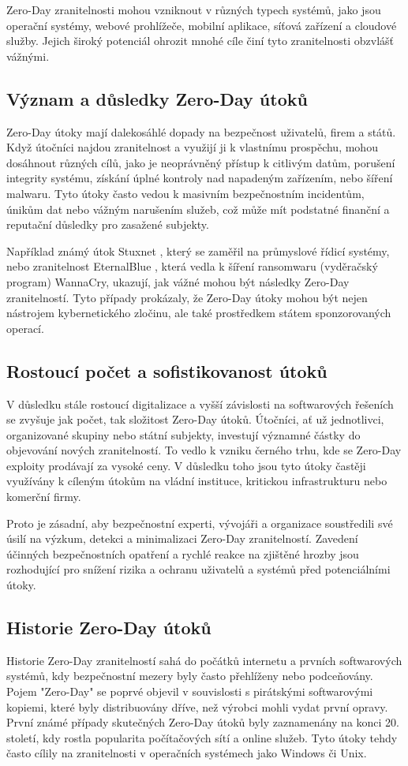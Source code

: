 \documentclass[11pt, conference, a4paper]{IEEEtran}
\begin{document}
Zero-Day zranitelnosti mohou vzniknout v různých typech systémů, jako jsou operační systémy, webové prohlížeče, mobilní aplikace, síťová zařízení a cloudové služby. Jejich široký potenciál ohrozit mnohé cíle činí tyto zranitelnosti obzvlášť vážnými.

\subsection{Význam a důsledky Zero-Day útoků}
Zero-Day útoky mají dalekosáhlé dopady na bezpečnost uživatelů, firem a států. Když útočníci najdou zranitelnost a využijí ji k vlastnímu prospěchu, mohou dosáhnout různých cílů, jako je neoprávněný přístup k citlivým datům, porušení integrity systému, získání úplné kontroly nad napadeným zařízením, nebo šíření malwaru. Tyto útoky často vedou k masivním bezpečnostním incidentům, únikům dat nebo vážným narušením služeb, což může mít podstatné finanční a reputační důsledky pro zasažené subjekty.

Například známý útok Stuxnet \cite{Popelova2016thesis}, který se zaměřil na průmyslové řídicí systémy, nebo zranitelnost EternalBlue \cite{EB}, která vedla k šíření ransomwaru (vyděračský program) WannaCry, ukazují, jak vážné mohou být následky Zero-Day zranitelností. Tyto případy prokázaly, že Zero-Day útoky mohou být nejen nástrojem kybernetického zločinu, ale také prostředkem státem sponzorovaných operací.

\subsection{Rostoucí počet a sofistikovanost útoků}
V důsledku stále rostoucí digitalizace a vyšší závislosti na softwarových řešeních se zvyšuje jak počet, tak složitost Zero-Day útoků. Útočníci, ať už jednotlivci, organizované skupiny nebo státní subjekty, investují významné částky do objevování nových zranitelností. To vedlo k vzniku černého trhu, kde se Zero-Day exploity prodávají za vysoké ceny. V důsledku toho jsou tyto útoky častěji využívány k cíleným útokům na vládní instituce, kritickou infrastrukturu nebo komerční firmy.

Proto je zásadní, aby bezpečnostní experti, vývojáři a organizace soustředili své úsilí na výzkum, detekci a minimalizaci Zero-Day zranitelností. Zavedení účinných bezpečnostních opatření a rychlé reakce na zjištěné hrozby jsou rozhodující pro snížení rizika a ochranu uživatelů a systémů před potenciálními útoky.

\subsection{Historie Zero-Day \' utok\r u \cite{article}}
Historie Zero-Day zranitelností sahá do počátků internetu a prvních softwarových systémů, kdy bezpečnostní mezery byly často přehlíženy nebo podceňovány. Pojem "Zero-Day" se poprvé objevil v souvislosti s pirátskými softwarovými kopiemi, které byly distribuovány dříve, než výrobci mohli vydat prvn\' i opravy. První známé případy skutečných Zero-Day útoků byly zaznamenány na konci 20. století, kdy rostla popularita počítačových sítí a online služeb. Tyto útoky tehdy často cílily na zranitelnosti v operačních systémech jako Windows či Unix.
\end{document}
